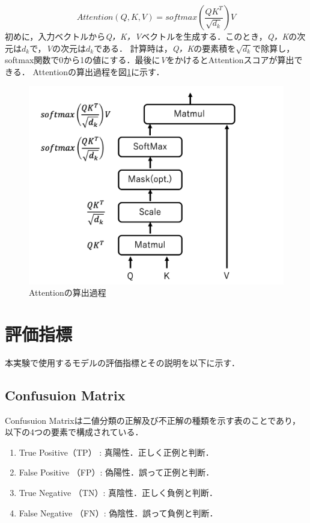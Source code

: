\documentclass[a4paper, oneside, openany, dvipdfmx]{suribt}%
\newcommand{\fref}[1]{図\ref{#1}}
\begin{document}
\begin{equation}
  Attention(Q,K,V) = softmax(\frac{QK^{T}}{\sqrt{d_{k}}})V
  \label{eq:network-input5}
\end{equation}
初めに，入力ベクトルから\textit{Q，K，V}ベクトルを生成する．このとき，\textit{Q，K}の次元は$d_{k}$で，\textit{V}の次元は$d_{k}$である．
計算時は，\textit{Q，K}の要素積を$\sqrt{d_{k}}$で除算し，softmax関数で0から1の値にする．最後に\textit{V}をかけるとAttentionスコアが算出できる．
Attentionの算出過程を\fref{fig:attention}に示す．
\begin{figure}[h]
  \centering
  \includegraphics[width=0.9\linewidth]{figs/attention.png}
  \caption{Attentionの算出過程}
  \label{fig:attention}
\end{figure}

\section{評価指標}
本実験で使用するモデルの評価指標とその説明を以下に示す．
\subsection{Confusuion Matrix}
Confusuion Matrixは二値分類の正解及び不正解の種類を示す表のことであり，以下の4つの要素で構成されている．
\begin{enumerate}
  \item True Positive（TP） : 真陽性．正しく正例と判断．
  \item False Positive （FP）: 偽陽性．誤って正例と判断．
  \item True Negative （TN）: 真陰性．正しく負例と判断．
  \item False Negative （FN）: 偽陰性．誤って負例と判断．
\end{enumerate}
\end{document}
